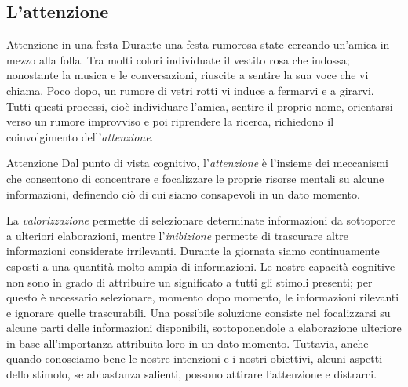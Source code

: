 \documentclass[a4paper]{article}
\begin{document}
\subsection{L'attenzione}
\begin{snippetexample}{Attenzione in una festa}
    Durante una festa rumorosa state cercando un'amica in mezzo alla folla. Tra molti colori individuate il vestito rosa che indossa; nonostante la musica e le conversazioni, riuscite a sentire la sua voce che vi chiama. Poco dopo, un rumore di vetri rotti vi induce a fermarvi e a girarvi. Tutti questi processi, cioè individuare l'amica, sentire il proprio nome, orientarsi verso un rumore improvviso e poi riprendere la ricerca, richiedono il coinvolgimento dell'\emph{attenzione}.
\end{snippetexample}
\begin{snippetdefinition}{Attenzione}
    Dal punto di vista cognitivo, l'\emph{attenzione} è l'insieme dei meccanismi che consentono di concentrare e focalizzare le proprie risorse mentali su alcune informazioni, definendo ciò di cui siamo consapevoli in un dato momento.
\end{snippetdefinition}
La \emph{valorizzazione} permette di selezionare determinate informazioni da sottoporre a ulteriori elaborazioni, mentre l'\emph{inibizione} permette di trascurare altre informazioni considerate irrilevanti.
Durante la giornata siamo continuamente esposti a una quantità molto ampia di informazioni. Le nostre capacità cognitive non sono in grado di attribuire un significato a tutti gli stimoli presenti; per questo è necessario selezionare, momento dopo momento, le informazioni rilevanti e ignorare quelle trascurabili.
Una possibile soluzione consiste nel focalizzarsi su alcune parti delle informazioni disponibili, sottoponendole a elaborazione ulteriore in base all'importanza attribuita loro in un dato momento. Tuttavia, anche quando conosciamo bene le nostre intenzioni e i nostri obiettivi, alcuni aspetti dello stimolo, se abbastanza salienti, possono attirare l'attenzione e distrarci.
\end{document}
